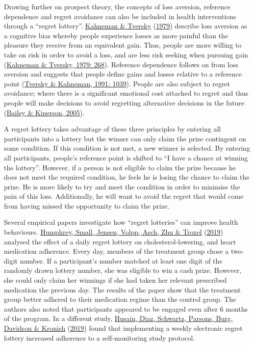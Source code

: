 \documentclass[11pt,preprint, authoryear]{elsarticle}
\numberwithin{equation}{section}
\numberwithin{figure}{section}
\numberwithin{table}{section}
\begin{document}
Drawing further on prospect theory, the concepts of loss aversion,
reference dependence and regret avoidance can also be included in health
interventions through a ``regret lottery''.
\protect\hyperlink{ref-prospect}{Kahneman \& Tversky}
(\protect\hyperlink{ref-prospect}{1979}) describe loss aversion as a
cognitive bias whereby people experience losses as more painful than the
pleasure they receive from an equivalent gain. Thus, people are more
willing to take on risk in order to avoid a loss, and are less risk
seeking when pursuing gain (\protect\hyperlink{ref-prospect}{Kahneman \&
Tversky, 1979: 268}). Reference dependence follows on from loss aversion
and suggests that people define gains and losses relative to a reference
point (\protect\hyperlink{ref-ref}{Tversky \& Kahneman, 1991: 1039}).
People are also subject to regret avoidance; where there is a
significant emotional cost attached to regret and thus people will make
decisions to avoid regretting alternative decisions in the future
(\protect\hyperlink{ref-regret}{Bailey \& Kinerson, 2005}).

A regret lottery takes advantage of these three principles by entering
all participants into a lottery but the winner can only claim the prize
contingent on some condition. If this condition is not met, a new winner
is selected. By entering all participants, people's reference point is
shifted to ``I have a chance at winning the lottery''. However, if a
person is not eligible to claim the prize because he does not meet the
required condition, he feels he is losing the chance to claim the prize.
He is more likely to try and meet the condition in order to minimise the
pain of this loss. Additionally, he will want to avoid the regret that
would come from having missed the opportunity to claim the prize.

Several empirical papers investigate how ``regret lotteries'' can
improve health behaviours. \protect\hyperlink{ref-adhere}{Humphrey,
Small, Jensen, Volpp, Asch, Zhu \& Troxel}
(\protect\hyperlink{ref-adhere}{2019}) analysed the effect of a daily
regret lottery on cholesterol-lowering, and heart medication adherence.
Every day, members of the treatment group chose a two-digit number. If a
participant's number matched at least one digit of the randomly drawn
lottery number, she was eligible to win a cash prize. However, she could
only claim her winnings if she had taken her relevant prescribed
medication the previous day. The results of the paper show that the
treatment group better adhered to their medication regime than the
control group. The authors also noted that participants appeared to be
engaged even after 6 months of the program. In a different study,
\protect\hyperlink{ref-regr}{Husain, Diaz, Schwartz, Parsons, Burg,
Davidson \& Kronish} (\protect\hyperlink{ref-regr}{2019}) found that
implementing a weekly electronic regret lottery increased adherence to a
self-monitoring study protocol.
\end{document}
